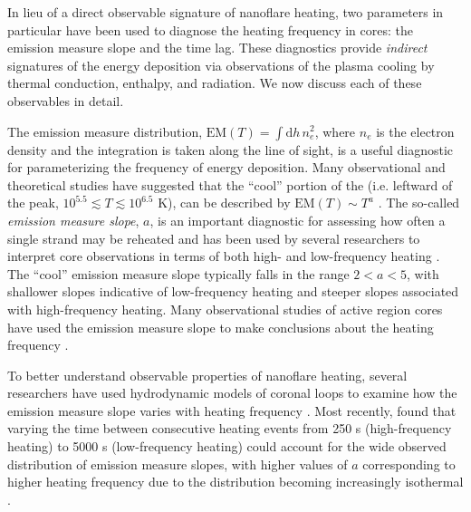 In lieu of a direct observable signature of nanoflare heating, two parameters in particular have been used to diagnose the heating frequency in \AR{} cores: the emission measure slope and the time lag. These diagnostics provide \textit{indirect} signatures of the energy deposition via observations of the plasma cooling by thermal conduction, enthalpy, and radiation. We now discuss each of these observables in detail.

The emission measure distribution, $\mathrm{EM}(T)=\int\mathrm{d}h\,n_e^2$, where $n_e$ is the electron density and the integration is taken along the line of sight, is a useful diagnostic for parameterizing the frequency of energy deposition. Many observational and theoretical studies have suggested that the ``cool'' portion of the \dem{} (i.e. leftward of the peak, $10^{5.5}\lesssim T\lesssim10^{6.5}$ K), can be described by $\mathrm{EM}(T)\sim T^a$ \citep{jordan_structure_1976,cargill_implications_1994,cargill_nanoflare_2004}. The so-called \textit{emission measure slope}, $a$, is an important diagnostic for assessing how often a single strand may be reheated and has been used by several researchers to interpret \AR{} core observations in terms of both high- and low-frequency heating \citep[see Table 3 of][and references therein]{bradshaw_diagnosing_2012}. The ``cool'' emission measure slope typically falls in the range $2<a<5$, with shallower slopes indicative of low-frequency heating and steeper slopes associated with high-frequency heating. Many observational studies of active region cores have used the emission measure slope to make conclusions about the heating frequency \citep[e.g.][]{tripathi_emission_2011,warren_constraints_2011,winebarger_using_2011,schmelz_cold_2012,warren_systematic_2012,del_zanna_evolution_2015}.

To better understand observable properties of nanoflare heating, several researchers have used hydrodynamic models of coronal loops to examine how the emission measure slope varies with heating frequency \citep[e.g.][]{mulu-moore_can_2011,bradshaw_diagnosing_2012,reep_diagnosing_2013}. Most recently, \citet{cargill_active_2014} found that varying the time between consecutive heating events from 250 s (high-frequency heating) to 5000 s (low-frequency heating) could account for the wide observed distribution of emission measure slopes, with higher values of $a$ corresponding to higher heating frequency due to the \dem{} distribution becoming increasingly isothermal \citep[see also][]{barnes_inference_2016-1}.

